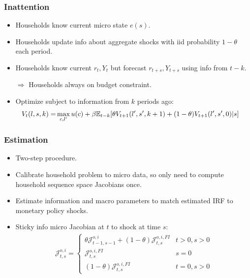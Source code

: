 \documentclass[english,xcolor=svgnames]{beamer}
\begin{document}
\begin{frame}
    \frametitle{Inattention}
    \begin{itemize}
        \item Households know current micro state $e(s)$.
        \item Households update info about aggregate shocks with iid probability $1-\theta$ each period.
        \item Households know current $r_t,Y_t$ but forecast $r_{t+s},Y_{t+s}$ using info from $t-k$. 
        \item[$\Rightarrow$] Households always on budget constraint.
        \item Optimize subject to information from $k$ periods ago:
        \begin{align*}
        	V_t(l,s,k) = &\max_{c,l'}u(c)+\beta\mathbb{E}_{t-k}[\theta V_{t+1}(l',s',k+1) + (1-\theta) V_{t+1}(l',s',0)|s] 
        \end{align*}
    \end{itemize}
\end{frame}

\begin{frame}
    \frametitle{Estimation}
    \begin{itemize}
        \item Two-step procedure.
        \item Calibrate household problem to micro data, so only need to compute household sequence space Jacobians once.
        \item Estimate information and macro parameters to match estimated IRF to monetary policy shocks.
        \item Sticky info micro Jacobian at $t$ to shock at time $s$:
        \begin{align*}
        	\mathcal{J}_{t,s}^{o,i} = \begin{cases}
        		\theta\mathcal{J}_{t-1,s-1}^{o,i} + (1-\theta)\mathcal{J}_{t,s}^{o,i,FI} & t>0, s>0 \\
        		\mathcal{J}_{t,s}^{o,i,FI} & s=0 \\
        		(1-\theta)\mathcal{J}_{t,s}^{o,i,FI} & t=0, s>0
        	\end{cases}
        \end{align*}
    \end{itemize}
\end{frame}
\end{document}
